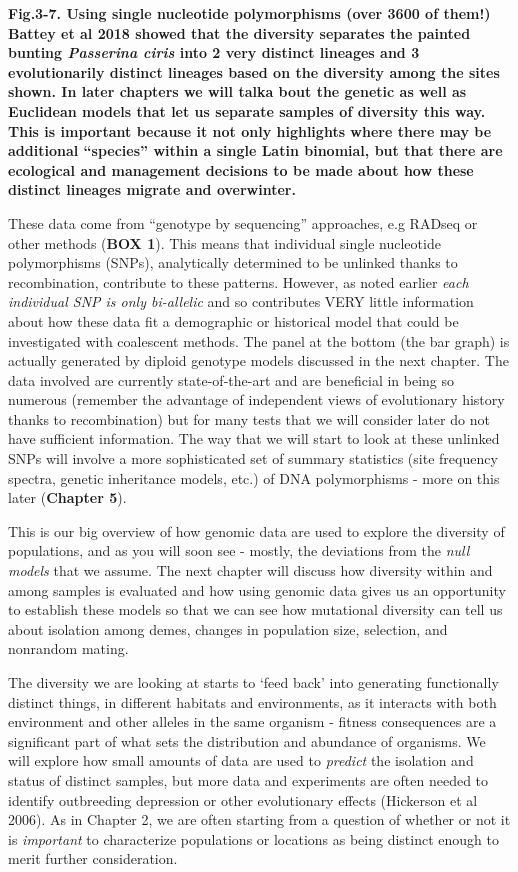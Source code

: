 \documentclass[
]{article}
\begin{document}
\textbf{Fig.3-7. Using single nucleotide polymorphisms (over 3600 of
them!) Battey et al 2018 showed that the diversity separates the painted
bunting \emph{Passerina ciris} into 2 very distinct lineages and 3
evolutionarily distinct lineages based on the diversity among the sites
shown. In later chapters we will talka bout the genetic as well as
Euclidean models that let us separate samples of diversity this way.
This is important because it not only highlights where there may be
additional ``species'' within a single Latin binomial, but that there
are ecological and management decisions to be made about how these
distinct lineages migrate and overwinter. }

These data come from ``genotype by sequencing'' approaches, e.g RADseq
or other methods (\textbf{BOX 1}). This means that individual single
nucleotide polymorphisms (SNPs), analytically determined to be unlinked
thanks to recombination, contribute to these patterns. However, as noted
earlier \emph{each individual SNP is only bi-allelic} and so contributes
VERY little information about how these data fit a demographic or
historical model that could be investigated with coalescent methods. The
panel at the bottom (the bar graph) is actually generated by diploid
genotype models discussed in the next chapter. The data involved are
currently state-of-the-art and are beneficial in being so numerous
(remember the advantage of independent views of evolutionary history
thanks to recombination) but for many tests that we will consider later
do not have sufficient information. The way that we will start to look
at these unlinked SNPs will involve a more sophisticated set of summary
statistics (site frequency spectra, genetic inheritance models, etc.) of
DNA polymorphisms - more on this later (\textbf{Chapter 5}).

This is our big overview of how genomic data are used to explore the
diversity of populations, and as you will soon see - mostly, the
deviations from the \emph{null models} that we assume. The next chapter
will discuss how diversity within and among samples is evaluated and how
using genomic data gives us an opportunity to establish these models so
that we can see how mutational diversity can tell us about isolation
among demes, changes in population size, selection, and nonrandom
mating.

The diversity we are looking at starts to `feed back' into generating
functionally distinct things, in different habitats and environments, as
it interacts with both environment and other alleles in the same
organism - fitness consequences are a significant part of what sets the
distribution and abundance of organisms. We will explore how small
amounts of data are used to \emph{predict} the isolation and status of
distinct samples, but more data and experiments are often needed to
identify outbreeding depression or other evolutionary effects (Hickerson
et al 2006). As in Chapter 2, we are often starting from a question of
whether or not it is \emph{important} to characterize populations or
locations as being distinct enough to merit further consideration.
\end{document}
